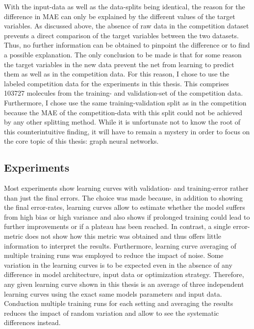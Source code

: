 With the input-data as well as the data-splits being identical, the reason for the difference in MAE can only be explained by the different values of the target variables. As discussed above, the absence of raw data in the competition dataset prevents a direct comparison of the target variables between the two datasets. Thus, no further information can be obtained to pinpoint the difference or to find a possible explanation. The only conclusion to be made is that for some reason the target variables in the new data prevent the net from learning to predict them as well as in the competition data. For this reason, I chose to use the labeled competition data for the experiments in this thesis. This comprises 103727 molecules from the training- and validation-set of the competition data.
Furthermore, I chose use the same training-validation split as in the competition because the MAE of the competition-data with this split could not be achieved by any other splitting method. While it is unfortunate not to know the root of this counterintuitive finding, it will have to remain a mystery in order to focus on the core topic of this thesis: graph neural networks. 


 
\subsection{Experiments}

Most experiments show learning curves with validation- and training-error rather than just the final errors. The choice was made because, in addition to showing the final error-rates, learning curves allow to estimate whether the model suffers from high bias or high variance and also shows if prolonged training could lead to further improvements or if a plateau has been reached. In contrast, a single error-metric does not show how this metric was obtained and thus offers little information to interpret the results. Furthermore, learning curve averaging of multiple training runs was employed to reduce the impact of noise. Some variation in the learning curves is to be expected even in the absence of any difference in model architecture, input data or optimization strategy. Therefore, any given learning curve shown in this thesis is an average of three independent learning curves using the exact same models parameters and input data. Conduction multiple training runs for each setting and averaging the results reduces the impact of random variation and allow to see the systematic differences instead. 


